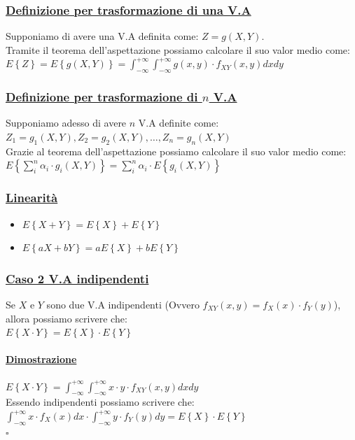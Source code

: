 \documentclass{article}
\begin{document}
\subsubsection{\underline{Definizione per trasformazione di una V.A}}
Supponiamo di avere una V.A definita come: $Z = g(X,Y)$. \\
Tramite il teorema dell'aspettazione possiamo calcolare il suo valor medio come:\\
$E\left\{ Z \right\} = E\left\{ g(X,Y) \right\} = \int_{-\infty}^{+\infty} \int_{-\infty}^{+\infty} g(x,y) \cdot f_{XY}(x,y) dx dy$
\subsubsection{\underline{Definizione per trasformazione di $n$ V.A}}
Supponiamo adesso di avere $n$ V.A definite come: $Z_1 = g_1(X,Y), Z_2 = g_2(X,Y), \dots, Z_n = g_n(X,Y)$ \\
Grazie al teorema dell'aspettazione possiamo calcolare il suo valor medio come: \\
$E\left\{ \sum_i^n \alpha_i \cdot g_i(X,Y) \right\} = \sum_i^n \alpha_i \cdot E\left\{ g_i(X,Y) \right\}$
\subsubsection{\underline{Linearità}}
\begin{itemize}
    \item $E\left\{ X+Y \right\} = E\left\{ X \right\} + E\left\{ Y \right\}$
    \item $E\left\{ aX + bY \right\} = aE\left\{ X \right\} + bE\left\{ Y \right\}$
\end{itemize}
\subsubsection{\underline{Caso 2 V.A indipendenti}}
Se $X$ e $Y$ sono due V.A indipendenti (Ovvero $f_{XY}(x,y) = f_X(x) \cdot f_Y(y)$), allora possiamo scrivere che: \\
$E\left\{ X \cdot Y \right\} = E\left\{ X \right\} \cdot E\left\{ Y \right\}$
\paragraph{\underline{Dimostrazione}}
$E\left\{ X \cdot Y \right\} = \int_{-\infty}^{+\infty} \int_{-\infty}^{+\infty} x \cdot y \cdot f_{XY}(x,y) dx dy$ \\
Essendo indipendenti possiamo scrivere che: \\
$\int_{-\infty}^{+\infty} x \cdot f_X(x) dx \cdot \int_{-\infty}^{+\infty} y \cdot f_Y(y) dy = E\left\{ X \right\} \cdot E\left\{ Y \right\}$ \\
\hspace*{0pt}\hfill $\square$
\end{document}
